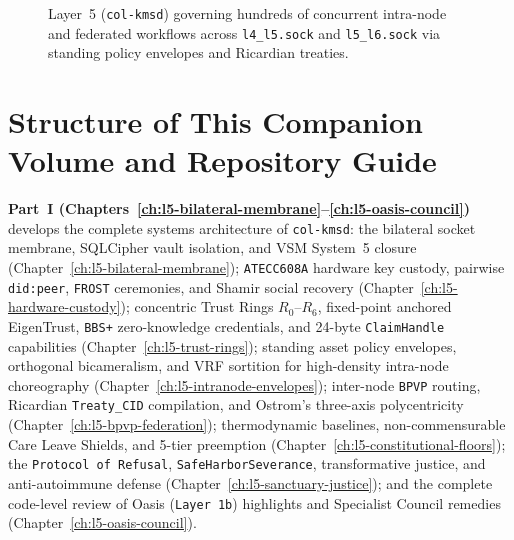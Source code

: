 \begin{figure}[htbp]
{%
}
\caption{Layer~5 (\texttt{col-kmsd}) governing hundreds of concurrent intra-node and federated workflows across \texttt{l4\_l5.sock} and \texttt{l5\_l6.sock} via standing policy envelopes and Ricardian treaties.}
\label{fig:preface-l5-hourglass}
\end{figure}

\section*{Structure of This Companion Volume and Repository Guide}

\textbf{Part~I (Chapters~\ref{ch:l5-bilateral-membrane}--\ref{ch:l5-oasis-council})} develops
the complete systems architecture of \texttt{col-kmsd}: the bilateral socket membrane, SQLCipher
vault isolation, and VSM System~5 closure (Chapter~\ref{ch:l5-bilateral-membrane});
\texttt{ATECC608A} hardware key custody, pairwise \texttt{did:peer}, \texttt{FROST} ceremonies,
and Shamir social recovery (Chapter~\ref{ch:l5-hardware-custody}); concentric Trust Rings
$R_0\text{--}R_6$, fixed-point anchored EigenTrust, \texttt{BBS+} zero-knowledge credentials,
and 24-byte \texttt{ClaimHandle} capabilities (Chapter~\ref{ch:l5-trust-rings}); standing asset
policy envelopes, orthogonal bicameralism, and VRF sortition for high-density intra-node
choreography (Chapter~\ref{ch:l5-intranode-envelopes}); inter-node \texttt{BPVP} routing,
Ricardian \texttt{Treaty\_CID} compilation, and Ostrom's three-axis polycentricity
(Chapter~\ref{ch:l5-bpvp-federation}); thermodynamic baselines, non-commensurable Care Leave
Shields, and 5-tier preemption (Chapter~\ref{ch:l5-constitutional-floors}); the \texttt{Protocol
of Refusal}, \texttt{SafeHarborSeverance}, transformative justice, and anti-autoimmune defense
(Chapter~\ref{ch:l5-sanctuary-justice}); and the complete code-level review of Oasis
(\texttt{Layer 1b}) highlights and Specialist Council remedies
(Chapter~\ref{ch:l5-oasis-council}).

